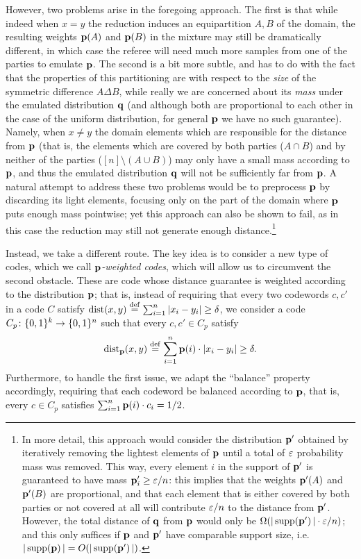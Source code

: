 However, two problems arise in the foregoing approach. The first is that while indeed when $x=y$ the reduction induces an equipartition $A,B$ of the domain, the resulting weights $\mathbf{p}(A)$ and $\mathbf{p}(B)$ in the mixture may still be dramatically different, in which case the referee will need much more samples from one of the parties to emulate $\mathbf{p}$. The second is a bit more subtle, and has to do with the fact that the properties of this partitioning are with respect to the \emph{size} of the symmetric difference $A\Delta B$, while really we are concerned about its \emph{mass} under the emulated distribution $\mathbf{q}$ (and although both are proportional to each other in the case of the uniform distribution, for general $\mathbf{p}$ we have no such guarantee). Namely, when $x \neq y$ the domain elements which are responsible for the  distance from $\mathbf{p}$ (that is, the elements which are covered by both parties ($A\cap B$) and by neither of the parties ($[n] \setminus (A\cup B)$) may only have a small mass according to $\mathbf{p}$, and thus the emulated distribution $\mathbf{q}$ will not be sufficiently far from $\mathbf{p}$. A natural attempt to address these two problems would be to preprocess $\mathbf{p}$ by discarding its light elements, focusing only on the part of the domain where $\mathbf{p}$ puts enough mass pointwise; yet this approach can also be shown to fail, as in this case the reduction may still not generate enough distance.\footnote{In more detail, this approach would consider the distribution $\mathbf{p}'$ obtained by iteratively removing the lightest elements of $\mathbf{p}$ until a total of $\varepsilon$ probability mass was removed. This way, every element $i$ in the support of $\mathbf{p}'$ is guaranteed to have mass $\mathbf{p}'_i \geq \varepsilon/n$: this implies that the weights $\mathbf{p}'(A)$ and $\mathbf{p}'(B)$ are proportional, and that each element that is either covered by both parties or not covered at all will contribute $\varepsilon/n$ to the distance from $\mathbf{p}'$. However, the total distance of $\mathbf{q}$ from $\mathbf{p}$ would only be $\bigOmega{|\supp{\p'}| \cdot \eps/n}$; and this only suffices if $\mathbf{p}$ and $\mathbf{p}'$ have comparable support size, i.e. $|\supp{\p}| = \bigO{|\supp{\p'}|}$.}

Instead, we take a different route. The key idea is to consider a new type of codes, which we call \emph{$\mathbf{p}$-weighted codes}, which will allow us to circumvent the second obstacle. These are code whose distance guarantee is weighted according to the distribution $\mathbf{p}$; that is, instead of requiring that every two codewords $c,c'$ in a code $C$ satisfy $\dist{x}{y} \eqdef \sum_{i=1}^{n} \abs{ x_i - y_i } \geq \delta$, we consider a code $C_p\colon \{0,1\}^k \to \{0,1\}^n$ such that every $c,c' \in C_p$ satisfy
\[
    \pdist[\p]{x}{y} \eqdef \sum_{i=1}^{n} \p(i)\cdot\abs{ x_i - y_i } \geq \delta.
\]
Furthermore, to handle the first issue, we adapt the ``balance'' property accordingly, requiring that each codeword be balanced according to $\mathbf{p}$, that is, every $c \in C_p$ satisfies $\sum_{i=1}^{n} \mathbf{p}(i)\cdot c_i = 1/2$.

